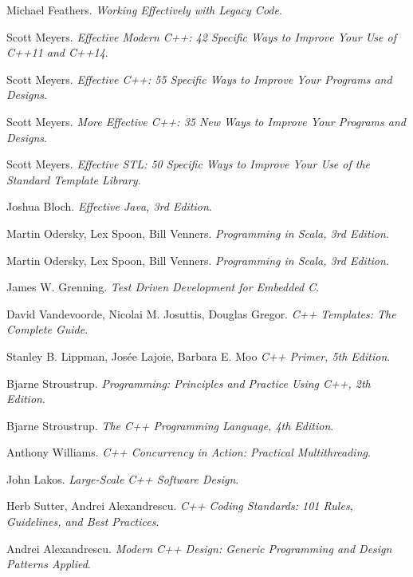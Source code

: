 \begin{thebibliography}{20}
{ Michael Feathers.
  \newblock \emph{Working Effectively with Legacy Code}.  

 Scott Meyers.
  \newblock \emph{Effective Modern C++: 42 Specific Ways to Improve Your Use of C++11 and C++14}.   

 Scott Meyers.
  \newblock \emph{Effective C++: 55 Specific Ways to Improve Your Programs and Designs}.   

 Scott Meyers.
  \newblock \emph{More Effective C++: 35 New Ways to Improve Your Programs and Designs}.   

 Scott Meyers.
  \newblock \emph{Effective STL: 50 Specific Ways to Improve Your Use of the Standard Template Library}.   

 Joshua Bloch.
  \newblock \emph{Effective Java, 3rd Edition}.   

 Martin Odersky, Lex Spoon, Bill Venners.
  \newblock \emph{Programming in Scala, 3rd Edition}.   

 Martin Odersky, Lex Spoon, Bill Venners.
  \newblock \emph{Programming in Scala, 3rd Edition}.   

 James W. Grenning.
  \newblock \emph{Test Driven Development for Embedded C}.   


 David Vandevoorde, Nicolai M. Josuttis, Douglas Gregor.
  \newblock \emph{C++ Templates: The Complete Guide}.   

 Stanley B. Lippman, Josée Lajoie, Barbara E. Moo
  \newblock \emph{C++ Primer, 5th Edition}.

 Bjarne Stroustrup.
  \newblock \emph{Programming: Principles and Practice Using C++, 2th Edition}.

 Bjarne Stroustrup.
  \newblock \emph{The C++ Programming Language, 4th Edition}.

 Anthony Williams.
  \newblock \emph{C++ Concurrency in Action: Practical Multithreading}.

 John Lakos.
  \newblock \emph{Large-Scale C++ Software Design}.

 Herb Sutter, Andrei Alexandrescu.
  \newblock \emph{C++ Coding Standards: 101 Rules, Guidelines, and Best Practices}.

 Andrei Alexandrescu.
  \newblock \emph{Modern C++ Design: Generic Programming and Design Patterns Applied}.

}
\end{thebibliography}

